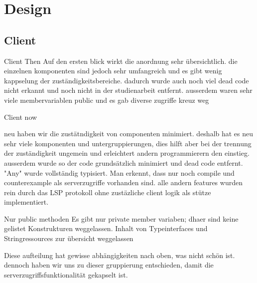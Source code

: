 \section{Design}

\subsection{Client}


Client Then
Auf den ersten blick wirkt die anordnung sehr übersichtlich.
die einzelnen komponenten sind jedoch sehr umfangreich und es gibt wenig kappselung der zuständigkeitsbereiche. dadurch wurde auch noch viel dead code nicht erkannt und noch nicht in der studienarbeit entfernt. ausserdem waren sehr viele membervariablen public und es gab diverse zugriffe kreuz weg

Client now

neu haben wir die zustätndigkeit von componenten minimiert. deshalb hat es neu sehr viele komponenten und untergruppierungen, dies hilft aber bei der trennung der zuständigkeit ungemein und erleichtert andern programmierern den einstieg.
ausserdem wurde so der code grundsätzlich minimiert und dead code entfernt.
"Any" wurde vollständig typisiert.
Man erkennt, dass nur noch compile und counterexample als serverzugriffe vorhanden sind. alle andern features wurden rein durch das LSP protokoll ohne zustäzliche client logik als stütze implementiert.

Nur public methoden
Es gibt nur private member variaben; dhaer sind keine gelistet
Konstrukturen weggelassen.
Inhalt von Typeinterfaces und Stringressources zur übersicht weggelassen

Diese aufteilung hat gewisse abhängigkeiten nach oben, was nicht schön ist.
dennoch haben wir uns zu dieser gruppierung entschieden,
damit die serverzugriffsfunktionalität gekapselt ist.
